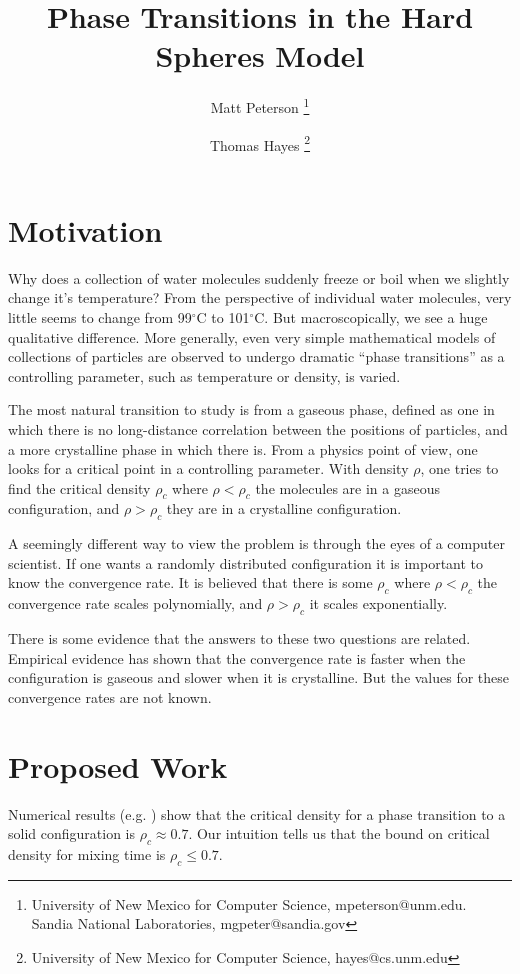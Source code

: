 \documentclass[a4paper,11pt]{article}
\title{Phase Transitions in the Hard Spheres Model}
\author{Matt Peterson \thanks{University of New Mexico for Computer Science, mpeterson@unm.edu. Sandia National Laboratories, mgpeter@sandia.gov} \and Thomas Hayes \thanks{University of New Mexico for Computer Science, hayes@cs.unm.edu}}
\begin{document}
\maketitle

\section*{Motivation}

Why does a collection of water molecules suddenly freeze or boil when we slightly change it's temperature?  From the perspective of individual water molecules, very little seems to change from 99$^\circ$C to 101$^\circ$C.  But macroscopically, we see a huge qualitative difference.  More generally, even very simple mathematical models of collections of particles are observed to undergo dramatic ``phase transitions'' as a controlling parameter, such as temperature or density, is varied.

The most natural transition to study is from a gaseous phase, defined as one in which there is no long-distance correlation between the positions of particles, and a more crystalline phase in which there is.  From a physics point of view, one looks for a critical point in a controlling parameter.  With density $\rho$, one tries to find the critical density $\rho_c$ where $\rho < \rho_c$ the molecules are in a gaseous configuration, and $\rho > \rho_c$ they are in a crystalline configuration.

A seemingly different way to view the problem is through the eyes of a computer scientist.  If one wants a randomly distributed configuration it is important to know the convergence rate.  It is believed that there is some $\rho_c$ where $\rho < \rho_c$ the convergence rate scales polynomially, and $\rho > \rho_c$ it scales exponentially.

There is some evidence that the answers to these two questions are related.  Empirical evidence has shown that the convergence rate is faster when the configuration is gaseous and slower when it is crystalline.  But the values for these convergence rates are not known.

\section*{Proposed Work}


Numerical results (e.g. \cite{Mak}\cite{Piasecki}) show that the critical density for a phase transition to a solid configuration is $\rho_c \approx 0.7$. Our intuition tells us that the bound on critical density for mixing time is $\rho_c \le 0.7$. 
\end{document}
